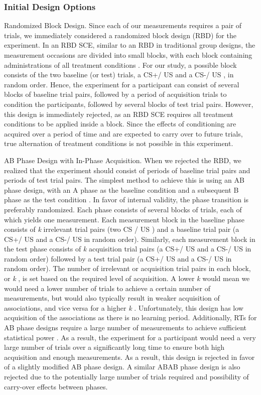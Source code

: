 \documentclass{article}
\begin{document}
\subsubsection{Initial Design Options} 

Randomized Block Design. Since each of our measurements requires a pair of trials, we immediately considered a randomized block design (RBD) for the experiment. In an RBD SCE, similar to an RBD in traditional group designs, the measurement occasions are divided into small blocks, with each block containing administrations of all treatment conditions \autocite{bib45} . For our study, a possible block consists of the two baseline (or test) trials, a CS+/ US  and a CS-/ US  , in random order. Hence, the experiment for a participant can consist of several blocks of baseline trial pairs, followed by a period of acquisition trials to condition the participants, followed by several blocks of test trial pairs. However, this design is immediately rejected, as an RBD SCE requires all treatment conditions to be applied inside a block. Since the effects of conditioning are acquired over a period of time and are expected to carry over to future trials, true alternation of treatment conditions is not possible in this experiment. 

AB Phase Design with In-Phase Acquisition. When we rejected the RBD, we realized that the experiment should consist of periods of baseline trial pairs and periods of test trial pairs. The simplest method to achieve this is using an AB phase design, with an A phase as the baseline condition and a subsequent B phase as the test condition \autocite{bib9} . In favor of internal validity, the phase transition is preferably randomized. Each phase consists of several blocks of trials, each of which yields one measurement. Each measurement block in the baseline phase consists of \emph{k} irrelevant trial pairs (two CS  / US  ) and a baseline trial pair (a CS+/ US  and a CS-/ US  in random order). Similarly, each measurement block in the test phase consists of \emph{k} acquisition trial pairs (a CS+/ US  and a CS-/ US  in random order) followed by a test trial pair (a CS+/ US  and a CS-/ US  in random order). The number of irrelevant or acquisition trial pairs in each block, or \emph{k} , is set based on the required level of acquisition. A lower \emph{k} would mean we would need a lower number of trials to achieve a certain number of measurements, but would also typically result in weaker acquisition of associations, and vice versa for a higher \emph{k} . Unfortunately, this design has low acquisition of the associations as there is no learning period. Additionally, RTs for AB phase designs require a large number of measurements to achieve sufficient statistical power \autocite{bib46,bib18} . As a result, the experiment for a participant would need a very large number of trials over a significantly long time to ensure both high acquisition and enough measurements. As a result, this design is rejected in favor of a slightly modified AB phase design. A similar ABAB phase design is also rejected due to the potentially large number of trials required and possibility of carry-over effects between phases. 
\end{document}
